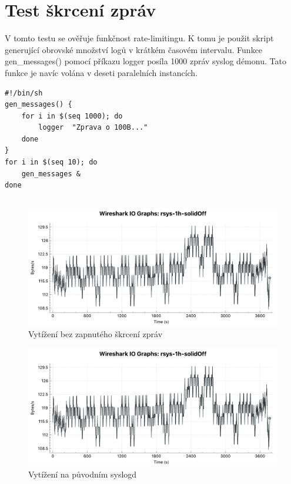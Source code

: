 \documentclass[thesis=B,czech]{FITthesis}[2012/06/26]
\begin{document}
\section{Test škrcení zpráv}
V tomto testu se ověřuje funkčnost rate-limitingu.
K tomu je použit skript generující obrovské množství logů v krátkém časovém intervalu. Funkce gen\_messages() pomocí příkazu logger posíla 1000 zpráv syslog démonu. Tato funkce je navíc volána v deseti paralelních instancích.

\begin{lstlisting}[style=AshStyle]
#!/bin/sh
gen_messages() {
	for i in $(seq 1000); do
		logger 	"Zprava o 100B..."
	done
}
for i in $(seq 10); do
	gen_messages &
done
\end{lstlisting}

\subsection*{}
\begin{figure}[H]
	\centering
	\includegraphics[scale=0.44]{images/test-1h-rsys-solidoff}
	\caption[Vytížení bez zapnutého škrcení zpráv]{Vytížení bez zapnutého škrcení zpráv}
\end{figure}

\begin{figure}[H]
	\centering
	\includegraphics[scale=0.44]{images/test-1h-rsys-solidoff}
	\caption[Vytížení na původním syslogd]{Vytížení na původním syslogd}
\end{figure}
\end{document}
